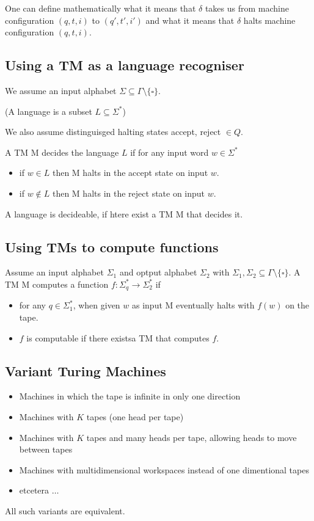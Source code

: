 \documentclass[a4paper,12pt]{article}
\theoremstyle{definition}
\theoremstyle{remark}
\begin{document}
One can define mathematically what it means that $\delta$ takes us from machine configuration $(q, t, i)$ to $(q', t', i')$ and
what it means that $\delta$ halts machine configuration $(q, t, i)$.

\subsection{Using a TM as a language recogniser}
We assume an input alphabet $\Sigma \subseteq \Gamma \setminus \{\square\}$.

(A language is a subset $L \subseteq \Sigma^*$)

We also assume distinguisged halting states accept, reject $\in Q$.

A TM M decides the language $L$ if for any input word $w \in \Sigma^*$
\begin{itemize}
    \item if $w \in L$ then M halts in the accept state on input $w$.
    \item if $w \notin L$ then M halts in the reject state on input $w$.
\end{itemize}

A language is decideable, if htere exist a TM M that decides it.

\subsection{Using TMs to compute functions}
Assume an input alphabet $\Sigma_1$ and optput alphabet $\Sigma_2$ with $\Sigma_1, \Sigma_2 \subseteq \Gamma \setminus \{\square\}$.
A TM M computes a function $f: \Sigma_q^* \to \Sigma_2^*$ if
\begin{itemize}
    \item for any $q \in \Sigma_1^*$, when given $w$ as input M eventually halts with $f(w)$ on the tape.
    \item $f$ is computable if there existsa TM that computes $f$.
\end{itemize}

\subsection{Variant Turing Machines}
\begin{itemize}
    \item Machines in which the tape is infinite in only one direction
    \item Machines with $K$ tapes (one head per tape)
    \item Machines with $K$ tapes and many heads per tape, allowing heads to move between tapes
    \item Machines with multidimensional workspaces instead of one dimentional tapes
    \item etcetera $\dots$
\end{itemize}
All such variants are equivalent.
\end{document}
